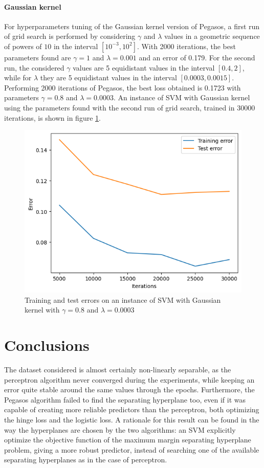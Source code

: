 \documentclass{article}
\begin{document}
\paragraph{Gaussian kernel}
For hyperparameters tuning of the Gaussian kernel version of Pegasos, a first run of grid search is performed by considering $\gamma$ and $\lambda$ values in a geometric sequence of powers of $10$ in the interval $[10^{-3}, 10^2]$. With 2000 iterations, the best parameters found are $\gamma=1$ and $\lambda=0.001$ and an error of 0.179. For the second run, the considered $\gamma$ values are 5 equidistant values in the interval $[0.4, 2]$, while for $\lambda$ they are 5 equidistant values in the interval $[0.0003, 0.0015]$. Performing 2000 iterations of Pegasos, the best loss obtained is 0.1723 with parameters $\gamma=0.8$ and $\lambda=0.0003$. An instance of SVM with Gaussian kernel using the parameters found with the second run of grid search, trained in 30000 iterations, is shown in figure \ref{fig:kgauss_svm.png}.

\begin{figure}
	\centering
	\includegraphics[width=0.6\columnwidth]{../plots/kgauss_svm.png}
	\caption{Training and test errors on an instance of SVM with Gaussian kernel with $\gamma=0.8$ and $\lambda=0.0003$}
	\label{fig:kgauss_svm.png}
\end{figure}

\section{Conclusions}
The dataset considered is almost certainly non-linearly separable, as the perceptron algorithm never converged during the experiments, while keeping an error quite stable around the same values through the epochs. Furthermore, the Pegasos algorithm failed to find the separating hyperplane too, even if it was capable of creating more reliable predictors than the perceptron, both optimizing the hinge loss and the logistic loss. A rationale for this result can be found in the way the hyperplanes are chosen by the two algorithms: an SVM explicitly optimize the objective function of the maximum margin separating hyperplane problem, giving a more robust predictor, instead of searching one of the available separating hyperplanes as in the case of perceptron. 
\end{document}
